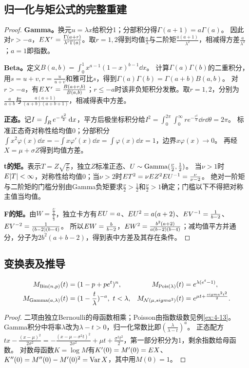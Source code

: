 \subsection{归一化与矩公式的完整重建}
\begin{proof}
\textbf{Gamma。}换元$u=\lambda x$给积分1；分部积分得$\Gamma(a+1)=a\Gamma(a)$。
因此对$r>-a$，$E X^r=\frac{\Gamma(a+r)}{\lambda^r\Gamma(a)}$。取$r=1,2$得到均值$\frac{a}{\lambda}$与二阶矩$\frac{a(a+1)}{\lambda^2}$，相减得方差$\frac{a}{\lambda^2}$；$a=1$即指数。

\textbf{Beta。}定义$B(a,b)=\int_0^1x^{a-1}(1-x)^{b-1}\dd x$。
计算$\Gamma(a)\Gamma(b)$的二重积分，用$s=u+v,r=\frac{u}{u+v}$和雅可比$s$，得到$\Gamma(a)\Gamma(b)=\Gamma(a+b)B(a,b)$。
对$r>-a$，有$E X^r=\frac{B(a+r,b)}{B(a,b)}$；$r\le-a$时该非负矩积分发散。取$r=1,2$，分别为$\frac{a}{a+b}$与$\frac{a(a+1)}{(a+b)(a+b+1)}$，相减得表中方差。

\textbf{正态。}记$I=\int_R e^{-\frac{x^2}{2}}\,\mathrm d x$，平方后极坐标积分给$I^2=\int_0^{2\pi}\int_0^\infty re^{-\frac{r^2}{2}}\dd r\dd\theta=2\pi$。
标准正态奇对称性给均值0；分部积分$\int x^2\varphi(x)\dd x=-\int x\varphi'(x)\dd x=\int\varphi(x)\dd x=1$，边界$x\varphi(x)\to0$。
再经$X=\mu+\sigma Z$得到均值方差。

\textbf{t的矩。}表示$T=Z\sqrt{\frac{\nu}{U}}$，独立$Z$标准正态、$U\sim\operatorname{Gamma}(\frac{\nu}{2},\frac{1}{2})$。
当$\nu>1$时$E|T|<\infty$，对称性给均值0；当$\nu>2$时$E T^2=\nu E Z^2E U^{-1}=\frac{\nu}{\nu-2}$。
绝对一阶矩与二阶矩的门槛分别由Gamma负矩要求$\frac{\nu}{2}>\frac{1}{2}$和$\frac{\nu}{2}>1$确定；门槛以下不得把对称主值当均值。

\textbf{F的矩。}由$W=\frac{\frac{U}{a}}{\frac{V}{b}}$，独立卡方有$E U=a$、$E U^2=a(a+2)$、$E V^{-1}=\frac{1}{b-2}$、$E V^{-2}=\frac{1}{(b-2)(b-4)}$。
所以$E W=\frac{b}{b-2}$，$E W^2=\frac{b^2(a+2)}{a(b-2)(b-4)}$；减均值平方并通分，分子为$2b^2(a+b-2)$，得到表中方差及其存在条件。
\end{proof}
\subsection{变换表及推导}
\begin{align*}
M_{\Bin(n,p)}(t)&=(1-p+pe^t)^n,&
M_{\Pois(\lambda)}(t)&=e^{\lambda(e^t-1)},\\
M_{\Ga(a,\lambda)}(t)&=(1-\dfrac{t}{\lambda})^{-a},\ t<\lambda,&
M_{\Normal(\mu,\sigma^2)}(t)&=e^{\mu t+\frac{\sigma^2t^2}{2}}.
\end{align*}
\begin{proof}
二项由独立Bernoulli的母函数相乘；Poisson由指数级数见例\ref{ex:4-13}。
Gamma积分中将率$\lambda$改为$\lambda-t>0$，归一化常数比即$(\frac{\lambda}{\lambda-t})^a$。
正态配方$tx-\frac{(x-\mu)^2}{2\sigma^2}=-\frac{(x-\mu-\sigma^2t)^2}{2\sigma^2}+\mu t+\frac{\sigma^2t^2}{2}$，第一部分积分为1，剩余指数给母函数。
对数母函数$K=\log M$有$K'(0)=M'(0)=E X$、$K''(0)=M''(0)-M'(0)^2=\operatorname{Var} X$，其中用$M(0)=1$。
\end{proof}

